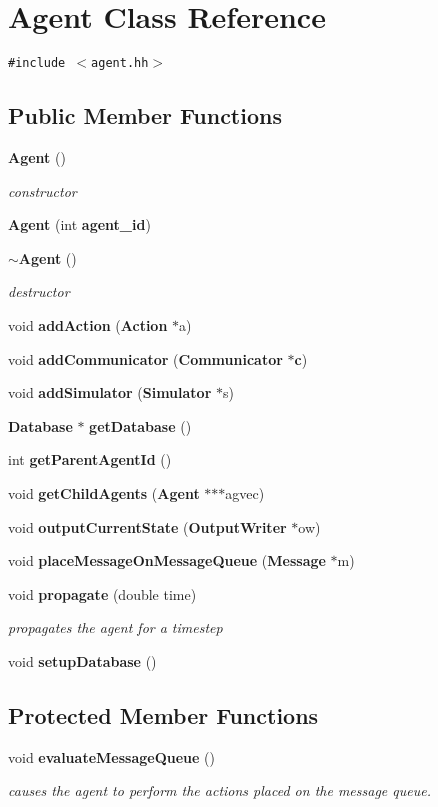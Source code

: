 \section{Agent Class Reference}
\label{classAgent}
{\tt \#include $<$agent.hh$>$}

\subsection*{Public Member Functions}
\begin{CompactItemize}
\item 
{\bf Agent} ()
\begin{CompactList}\small\item\em constructor \item\end{CompactList}\item 
{\bf Agent} (int {\bf agent\_\-id})
\item 
{\bf $\sim$Agent} ()
\begin{CompactList}\small\item\em destructor \item\end{CompactList}\item 
void {\bf addAction} ({\bf Action} $\ast$a)
\item 
void {\bf addCommunicator} ({\bf Communicator} $\ast${\bf c})
\item 
void {\bf addSimulator} ({\bf Simulator} $\ast$s)
\item 
{\bf Database} $\ast$ {\bf getDatabase} ()
\item 
int {\bf getParentAgentId} ()
\item 
void {\bf getChildAgents} ({\bf Agent} $\ast$$\ast$$\ast$agvec)
\item 
void {\bf outputCurrentState} ({\bf OutputWriter} $\ast$ow)
\item 
void {\bf placeMessageOnMessageQueue} ({\bf Message} $\ast$m)
\item 
void {\bf propagate} (double time)
\begin{CompactList}\small\item\em propagates the agent for a timestep \item\end{CompactList}\item 
void {\bf setupDatabase} ()
\end{CompactItemize}
\subsection*{Protected Member Functions}
\begin{CompactItemize}
\item 
void {\bf evaluateMessageQueue} ()
\begin{CompactList}\small\item\em causes the agent to perform the actions placed on the message queue. \item\end{CompactList}\end{CompactItemize}
